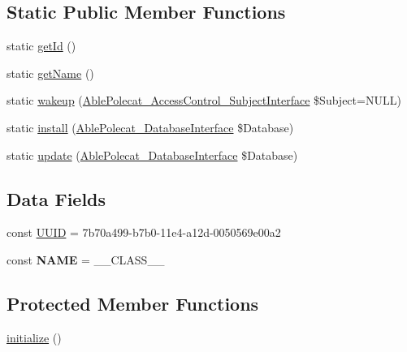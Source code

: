 \subsection*{Static Public Member Functions}
\begin{DoxyCompactItemize}
\item 
static \hyperlink{class_able_polecat___registry___class_acfaa3a96d0cb5a4c0d4d710dcba41e9e}{get\+Id} ()
\item 
static \hyperlink{class_able_polecat___registry___class_a4ef9bd37ba3ce8a13c1e8bcf4f72a630}{get\+Name} ()
\item 
static \hyperlink{class_able_polecat___registry___class_a3f2135f6ad45f51d075657f6d20db2cd}{wakeup} (\hyperlink{interface_able_polecat___access_control___subject_interface}{Able\+Polecat\+\_\+\+Access\+Control\+\_\+\+Subject\+Interface} \$Subject=N\+U\+L\+L)
\item 
static \hyperlink{class_able_polecat___registry___class_a97e9bacf538c072e0542eeb96d2475af}{install} (\hyperlink{interface_able_polecat___database_interface}{Able\+Polecat\+\_\+\+Database\+Interface} \$Database)
\item 
static \hyperlink{class_able_polecat___registry___class_a8398510e79e9787266fe116d6431948c}{update} (\hyperlink{interface_able_polecat___database_interface}{Able\+Polecat\+\_\+\+Database\+Interface} \$Database)
\end{DoxyCompactItemize}
\subsection*{Data Fields}
\begin{DoxyCompactItemize}
\item 
const \hyperlink{class_able_polecat___registry___class_a74b892c8c0b86bf9d04c5819898c51e7}{U\+U\+I\+D} = \textquotesingle{}7b70a499-\/b7b0-\/11e4-\/a12d-\/0050569e00a2\textquotesingle{}
\item 
\hypertarget{class_able_polecat___registry___class_a244352f035b82b20b0efa506167fd862}{}const {\bfseries N\+A\+M\+E} = \+\_\+\+\_\+\+C\+L\+A\+S\+S\+\_\+\+\_\+\label{class_able_polecat___registry___class_a244352f035b82b20b0efa506167fd862}

\end{DoxyCompactItemize}
\subsection*{Protected Member Functions}
\begin{DoxyCompactItemize}
\item 
\hyperlink{class_able_polecat___registry___class_a91098fa7d1917ce4833f284bbef12627}{initialize} ()
\end{DoxyCompactItemize}
